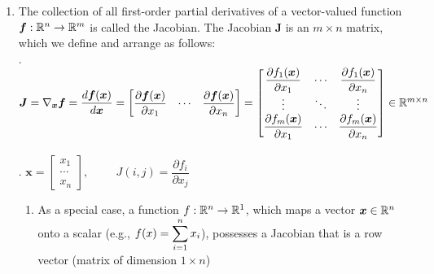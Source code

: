 \begin{enumerate}
    \item 
    \begin{definition}[Jacobian ($\bm{J} = \nabla_{\bm{x}}\bm{f} = \dfrac{d \bm{f}(\bm{x})}{d \bm{x}}$)]
        The collection of all first-order partial derivatives of a vector-valued function $\bm{f} : \mathbb{R}^n \to \mathbb{R}^m$ is called the Jacobian. 
        The Jacobian $\bm{J}$ is an $m \times n$ matrix, which we define and arrange as follows:
        \hfill \cite{mfml/book/mml/Deisenroth-Faisal-Ong}
        \\
        .\hfill
        $
            \bm{J} 
            = \nabla_{\bm{x}}\bm{f}
            = \dfrac{d \bm{f}(\bm{x})}{d \bm{x}}
            = \begin{bmatrix}
                \dfrac{\partial \bm{f}(\bm{x})}{\partial x_1} &
                \cdots &
                \dfrac{\partial \bm{f}(\bm{x})}{\partial x_n}
            \end{bmatrix}
            = \begin{bmatrix}
                \dfrac{\partial f_1(\bm{x})}{\partial x_1} &
                \cdots &
                \dfrac{\partial f_1(\bm{x})}{\partial x_n} \\
                \vdots & \ddots & \vdots \\
                \dfrac{\partial f_m(\bm{x})}{\partial x_1} &
                \cdots &
                \dfrac{\partial f_m(\bm{x})}{\partial x_n} \\
            \end{bmatrix}
            \in \mathbb{R}^{m\times n}
        $
        \hfill \cite{mfml/book/mml/Deisenroth-Faisal-Ong}
        \\
        .\hfill
        $
            \bm{x} = \begin{bmatrix}
                x_1 \\ \cdots \\ x_n
            \end{bmatrix},
            \hspace{1cm}
            J(i,j) = \dfrac{\partial f_i}{\partial x_j}
        $
        \hfill \cite{mfml/book/mml/Deisenroth-Faisal-Ong}
    \end{definition}
    \begin{enumerate}
        \item As a special case, a function $f : \mathbb{R}^n \to \mathbb{R}^1$, which maps a vector $\bm{x} \in \mathbb{R}^n$ onto a scalar (e.g., $f (x) = \displaystyle\sum^n _{i=1} x_i$), possesses a Jacobian that is a row vector (matrix of dimension $1 \times n$)
        \hfill \cite{mfml/book/mml/Deisenroth-Faisal-Ong}


\end{enumerate}
\end{enumerate}
